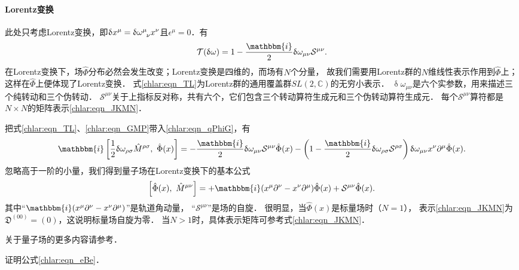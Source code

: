 \paragraph{Lorentz变换}
此处只考虑Lorentz变换，即$\updelta x^\mu= \updelta\omega^\mu_{\hphantom{\mu}\nu}x^\nu$且$\epsilon^\mu=0$．有
\begin{equation}\label{chlar:eqn_TL}
	\mathcal{T}(\updelta\omega)=1-\frac{\mathbbm{i}}{2} \updelta\omega_{\mu\nu} \mathcal{S}^{\mu\nu}.
\end{equation}
在Lorentz变换下，场$\hat{\Phi}$分布必然会发生改变；Lorentz变换是四维的，而场有$N$个分量，
故我们需要用Lorentz群的$N$维线性表示作用到$\hat{\Phi}$上；这样在$\hat{\Phi}$上便体现了Lorentz变换．
式\eqref{chlar:eqn_TL}为Lorentz群的通用覆盖群$SL(2,\mathbb{C})$的无穷小表示．
$\updelta\omega_{\mu\nu}$是六个实参数，用来描述三个纯转动和三个伪转动．
$\mathcal{S}^{\mu\nu}$关于上指标反对称，共有六个，它们包含三个转动算符生成元和三个伪转动算符生成元．
每个$\mathcal{S}^{\mu\nu}$算符都是$N\times N$的矩阵表示\eqref{chlar:eqn_JKMN}．

把式\eqref{chlar:eqn_TL}、\eqref{chlar:eqn_GMP}带入\eqref{chlar:eqn_qPhiG}，有
\begin{align*}
	\mathbbm{i}\left[ \frac{1}{2}\updelta\omega_{\rho\sigma} \hat{M}^{\rho\sigma},\ \hat{\Phi}(x)\right] = 
	-\frac{\mathbbm{i}}{2} \updelta\omega_{\mu\nu} \mathcal{S}^{\mu\nu} \hat{\Phi}(x)
	-\left(1-\frac{\mathbbm{i}}{2} \updelta\omega_{\rho\sigma} \mathcal{S}^{\rho\sigma}\right)  
	\updelta\omega_{\mu\nu}x^\nu  \partial^{\mu}\hat{\Phi}(x) .
\end{align*}
忽略高于一阶的小量，我们得到量子场在Lorentz变换下的基本公式
\begin{equation}\label{chlar:eqn_Phi-Lorentz}
	\left[\hat{\Phi}(x),\ \hat{M}^{\mu\nu}\right] = 
	+\mathbbm{i}(x^\mu  \partial^{\nu}-x^\nu  \partial^{\mu})\hat{\Phi}(x)
	+\mathcal{S}^{\mu\nu} \hat{\Phi}(x) .
\end{equation}
其中“$\mathbbm{i}(x^\mu  \partial^{\nu}-x^\nu  \partial^{\mu})$”是轨道角动量，
“$\mathcal{S}^{\mu\nu}$”是场的自旋．
很明显，当$\hat{\Phi}(x)$是标量场时（$N=1$），
表示\eqref{chlar:eqn_JKMN}为$\mathfrak{D}^{(00)} = (0)$，这说明标量场自旋为零．
当$N>1$时，具体表示矩阵可参考式\eqref{chlar:eqn_JKMN}．

关于量子场的更多内容请参考\parencite[\S 5.6,5.7]{weinberg_vol1}．



\begin{example}\label{chlar:exam_eBe}
	证明公式\eqref{chlar:eqn_eBe}．
\end{example}

